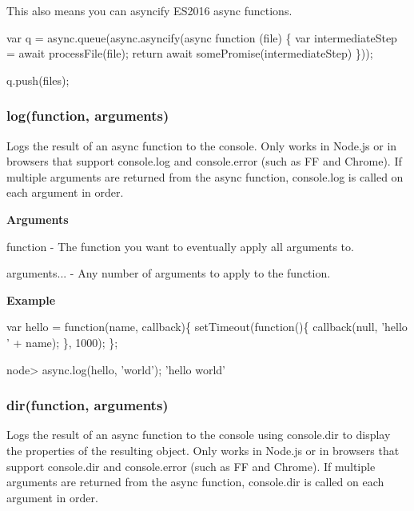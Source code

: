 This also means you can asyncify E\+S2016 {\ttfamily async} functions.


\begin{DoxyCode}
var q = async.queue(async.asyncify(async function (file) \{
  var intermediateStep = await processFile(file);
  return await somePromise(intermediateStep)
\}));

q.push(files);
\end{DoxyCode}
 



\label{_log}%
 \subsubsection*{log(function, arguments)}

Logs the result of an {\ttfamily async} function to the {\ttfamily console}. Only works in Node.\+js or in browsers that support {\ttfamily console.\+log} and {\ttfamily console.\+error} (such as FF and Chrome). If multiple arguments are returned from the async function, {\ttfamily console.\+log} is called on each argument in order.

{\bfseries Arguments}


\begin{DoxyItemize}
\item {\ttfamily function} -\/ The function you want to eventually apply all arguments to.
\item {\ttfamily arguments...} -\/ Any number of arguments to apply to the function.
\end{DoxyItemize}

{\bfseries Example}


\begin{DoxyCode}
var hello = function(name, callback)\{
    setTimeout(function()\{
        callback(null, 'hello ' + name);
    \}, 1000);
\};
\end{DoxyCode}
 
\begin{DoxyCode}
node> async.log(hello, 'world');
'hello world'
\end{DoxyCode}
 



\label{_dir}%
 \subsubsection*{dir(function, arguments)}

Logs the result of an {\ttfamily async} function to the {\ttfamily console} using {\ttfamily console.\+dir} to display the properties of the resulting object. Only works in Node.\+js or in browsers that support {\ttfamily console.\+dir} and {\ttfamily console.\+error} (such as FF and Chrome). If multiple arguments are returned from the async function, {\ttfamily console.\+dir} is called on each argument in order.

